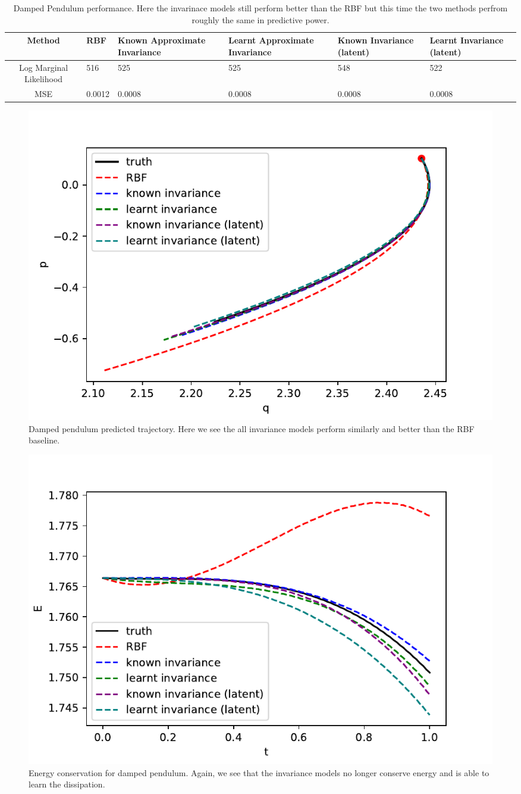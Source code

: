 \documentclass{statsmsc}
\begin{document}
\begin{table}[H]
    \centering
\begin{tabularx}{\linewidth}{c|LLLLL} 
    \hline
Method           & RBF & Known Approximate Invariance&  Learnt Approximate Invariance & Known Invariance (latent) & Learnt Invariance (latent)\\
  \hline
Log Marginal Likelihood & 516 & 525 & 525 & 548 & 522 \\
MSE & 0.0012 & 0.0008 & 0.0008 & 0.0008 & 0.0008 \\
    \hline
\end{tabularx}
\caption{Damped Pendulum performance. Here the invarinace models still perform better than the RBF but this time the two methods perfrom roughly the same in predictive power.}
\label{tab:damped_pendulum_performance}
    \end{table}

\begin{figure}[H]
        \centering
        \includegraphics[width=0.8\linewidth]{../codes/figures/damped_pendulum_predicted.pdf}
        \caption{Damped pendulum predicted trajectory. Here we see the all invariance models perform similarly and better than the RBF baseline.}
        \label{fig:damped_pendulum_prediction}
\end{figure}

\begin{figure}[H] 
  \includegraphics[width=0.8\linewidth]{../codes/figures/damped_pendulum_energy.pdf}
  \centering
  \caption{Energy conservation for damped pendulum. Again, we see that the invariance models no longer conserve energy and is able to learn the dissipation.}
  \label{fig:damped_pendulum_energy}
\end{figure}
\end{document}
